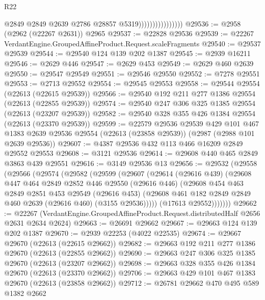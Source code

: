 \begin{lexlean}{R22}
\begin{coremodule}
                                    @2849
                                    @2849
                                    @2639
                                    @2786
                                    @28857
                                    @5319))))))))))))))))
@29536 := @2958 (@2962 (@22267 @2631)) @2965
@29537 := @22828 @29536
@29539 := @22267 VerdantEngine.GroupedAffineProduct.Request.scaleFragments
@29540 := @29537 @29539
@29544 := @29540 @124 @139 @202 @1387
@29545 := @2939 @16211
@29546 := @2629 @446
@29547 := @2629 @453
@29549 := @2629 @460 @2639
@29550 := @29547 @29549
@29551 := @29546 @29550
@29552 := @7278 @29551
@29553 := @2713 @29552
@29554 := @29545 @29553
@29558 := @29544 @29554 (@22613 (@22615 @29539))
@29566 := @29540 @192 @211 @277 @1386 @29554 (@22613 (@22855 @29539))
@29574 := @29540 @247 @306 @325 @1385 @29554 (@22613 (@23207 @29539))
@29582 := @29540 @328 @355 @426 @1384 @29554 (@22613 (@23370 @29539))
@29599 := @22579
    @29536
    @29539
    @429
    @101
    @467
    @1383
    @2639
    @29536
    @29554
    (@22613 (@23858 @29539))
    (@2987 (@2988 @101 @2639 @29536))
@29607 := @4387 @29536 @432 @113 @466 @16209 @2849 @29552 @29553
@29608 := @3121 @29536
@29614 := @29608 @440 @465 @2849 @3863 @439 @29551
@29616 := @3149 @29536 @13
@29656 := @29532
    (@29558
      (@29566
        (@29574
          (@29582
            (@29599
              (@29607
                (@29614
                  (@29616 @439)
                  (@29608
                    @447
                    @464
                    @2849
                    @2852
                    @446
                    @29550
                    (@29616 @446)
                    (@29608
                      @454
                      @463
                      @2849
                      @2851
                      @453
                      @29549
                      (@29616 @453)
                      (@29608 @461 @182 @2849 @2849 @460 @2639 (@29616 @460) (@3155 @29536)))))
                (@17613 @29552)))))))
@29662 := @22267
    (VerdantEngine.GroupedAffineProduct.Request.distributedHalf @2656 @2631 @2634 @2624)
@29663 := @26691 @29662
@29667 := @29663 @124 @139 @202 @1387
@29670 := @2939 @22253 (@4022 @22535)
@29674 := @29667 @29670 (@22613 (@22615 @29662))
@29682 := @29663 @192 @211 @277 @1386 @29670 (@22613 (@22855 @29662))
@29690 := @29663 @247 @306 @325 @1385 @29670 (@22613 (@23207 @29662))
@29698 := @29663 @328 @355 @426 @1384 @29670 (@22613 (@23370 @29662))
@29706 := @29663 @429 @101 @467 @1383 @29670 (@22613 (@23858 @29662))
@29712 := @26781 @29662 @470 @495 @589 @1382 @2662

\end{coremodule}
\end{lexlean}
